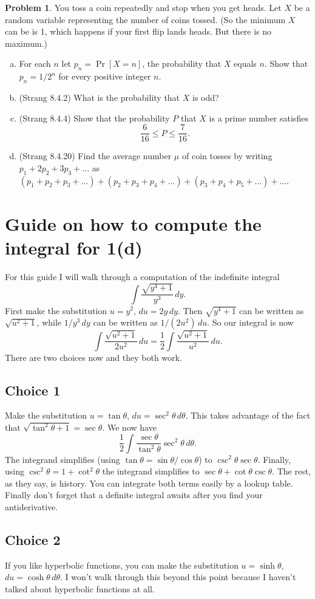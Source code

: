 \documentclass[11pt,oneside]{amsart}
\theoremstyle{definition}
\newtheorem{problem}{Problem}
\begin{document}
    \begin{problem}
        You toss a coin repeatedly and stop when you get heads. Let $X$ be a random variable representing the number of coins tossed. (So the minimum $X$ can be is 1, which happens if your first flip lands heads. But there is no maximum.)
        \begin{enumerate}[(a)]
            \item For each $n$ let $p_n=\Pr[X=n]$, the probability that $X$ equals $n$. Show that $p_n=1/2^n$ for every positive integer $n$.
            \item (Strang 8.4.2) What is the probability that $X$ is odd?
            \item (Strang 8.4.4) Show that the probability $P$ that $X$ is a prime number satisfies
            \[\frac 6{16}\leq P\leq \frac 7{16}.\]
            \item (Strang 8.4.20) Find the average number $\mu$ of coin tosses by writing $p_1+2p_2+3p_3+\dots$ as $(p_1+p_2+p_3+\dots)+(p_2+p_3+p_4+\dots)+(p_3+p_4+p_5+\dots)+\dots$.
        \end{enumerate}
    \end{problem}


    \newpage

    \section*{Guide on how to compute the integral for 1(d)}

    For this guide I will walk through a computation of the indefinite integral
    \[\int\frac {\sqrt{y^4+1}}{y^3}\,dy.\]
    First make the substitution $u=y^2$, $du=2y\,dy$. Then $\sqrt{y^4+1}$ can be written as $\sqrt{u^2+1}$, while $1/y^3\,dy$ can be written as $1/(2u^2)\,du$. So our integral is now
    \[\int\frac{\sqrt{u^2+1}}{2u^2}\,du=\frac12\int\frac{\sqrt{u^2+1}}{u^2}\,du.\]
    There are two choices now and they both work.
    \subsection*{Choice 1}
    Make the substitution $u=\tan\theta$, $du=\sec^2\theta\,d\theta$. This takes advantage of the fact that $\sqrt{\tan^2\theta+1}=\sec\theta$. We now have
    \[\frac12\int \frac{\sec\theta}{\tan^2\theta}\sec^2\theta\,d\theta. \]
    The integrand simplifies (using $\tan\theta=\sin\theta/\cos\theta$) to $\csc^2\theta\sec\theta$. Finally, using $\csc^2\theta=1+\cot^2\theta$ the integrand simplifies to $\sec\theta+\cot\theta\csc\theta$. The rest, as they say, is history. You can integrate both terms easily by a lookup table. Finally don't forget that a definite integral awaits after you find your antiderivative.

    \subsection*{Choice 2}
    If you like hyperbolic functions, you can make the substitution $u=\sinh\theta$, $du=\cosh\theta\,d\theta$. I won't walk through this beyond this point because I haven't talked about hyperbolic functions at all.
\end{document}
